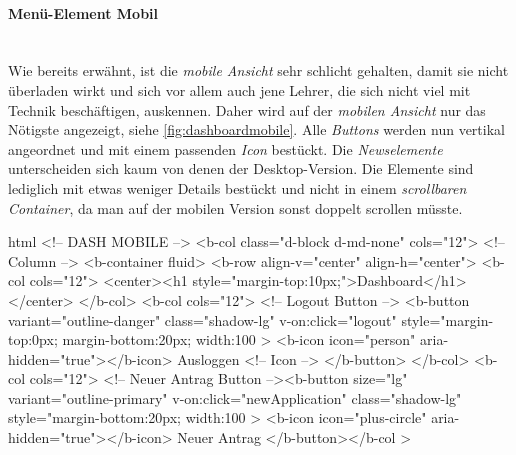 \paragraph{Menü-Element Mobil}
~\\
Wie bereits erwähnt, ist die \textit{mobile Ansicht} sehr schlicht gehalten, damit sie nicht überladen wirkt und sich vor allem auch jene Lehrer, die sich nicht viel mit Technik beschäftigen, auskennen. Daher wird auf der \textit{mobilen Ansicht} nur das Nötigste angezeigt, siehe \autoref{fig:dashboardmobile}. Alle \textit{Buttons} werden nun vertikal angeordnet und mit einem passenden \textit{Icon} bestückt. Die \textit{Newselemente} unterscheiden sich kaum von denen der Desktop-Version. Die Elemente sind lediglich mit etwas weniger Details bestückt und nicht in einem \textit{scrollbaren Container}, da man auf der mobilen Version sonst doppelt scrollen müsste.
\begin{code}{html}
	<!-- DASH MOBILE -->
	<b-col class="d-block d-md-none" cols="12">
	  <!-- Column -->
	  <b-container fluid>
		<b-row align-v="center" align-h="center">
		  <b-col cols="12">
			<center><h1 style="margin-top:10px;">Dashboard</h1></center>
		  </b-col>
		  <b-col cols="12">
			<!-- Logout Button -->
			<b-button
			  variant="outline-danger"
			  class="shadow-lg"
			  v-on:click="logout"
			  style="margin-top:0px; margin-bottom:20px; width:100%
			>
			  <b-icon icon="person" aria-hidden="true"></b-icon> Ausloggen
			  <!-- Icon -->
			</b-button>
		  </b-col>
		  <b-col cols="12">
			<!-- Neuer Antrag Button --><b-button
			  size="lg"
			  variant="outline-primary"
			  v-on:click="newApplication"
			  class="shadow-lg"
			  style="margin-bottom:20px; width:100%
			>
			  <b-icon icon="plus-circle" aria-hidden="true"></b-icon> Neuer
			  Antrag
			</b-button></b-col
		  >	
\end{code}
	\label{list:startmobile} ~\\
